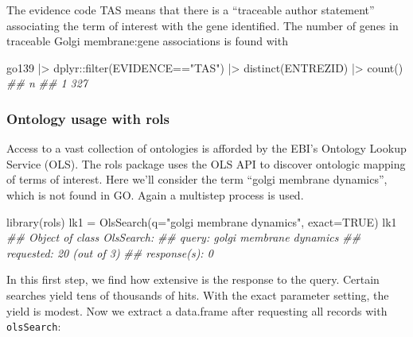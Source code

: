 \documentclass[]{article}
\newcommand{\hlstr}[1]{\textcolor[rgb]{0.251,0.627,0.251}{#1}}%
\newcommand{\hlcom}[1]{\textcolor[rgb]{0.502,0.502,0.502}{\textit{#1}}}%
\newcommand{\hlopt}[1]{\textcolor[rgb]{0,0,0}{#1}}%
\newcommand{\hlstd}[1]{\textcolor[rgb]{0.251,0.251,0.251}{#1}}%
\newcommand{\hlkwc}[1]{\textcolor[rgb]{0.251,0.251,0.251}{#1}}%
\newcommand{\hlkwd}[1]{\textcolor[rgb]{0.878,0.439,0.125}{#1}}%
\newenvironment{Shaded}{\begin{myshaded}}{\end{myshaded}}
\newcommand{\KeywordTok}[1]{\hlkwd{#1}}
\newcommand{\DataTypeTok}[1]{\hlkwc{#1}}
\newcommand{\StringTok}[1]{\hlstr{#1}}
\newcommand{\CommentTok}[1]{\hlcom{#1}}
\newcommand{\OtherTok}[1]{{#1}}
\newcommand{\OperatorTok}[1]{\hlopt{#1}}
\newcommand{\ErrorTok}[1]{\textcolor{errorcolor}{#1}}
\newcommand{\NormalTok}[1]{\hlstd{#1}}
\begin{document}
The evidence code TAS means that there is a ``traceable author statement''
associating the term of interest with the gene identified. The
number of genes in traceable Golgi membrane:gene associations
is found with

\begin{Shaded}
\begin{Highlighting}[]
\NormalTok{go139 }\OperatorTok{|}\ErrorTok{\textgreater{}}\StringTok{ }\NormalTok{dplyr}\OperatorTok{::}\KeywordTok{filter}\NormalTok{(EVIDENCE}\OperatorTok{==}\StringTok{"TAS"}\NormalTok{) }\OperatorTok{|}\ErrorTok{\textgreater{}}\StringTok{ }\KeywordTok{distinct}\NormalTok{(ENTREZID) }\OperatorTok{|}\ErrorTok{\textgreater{}}\StringTok{ }\KeywordTok{count}\NormalTok{()}
\CommentTok{\#\#     n}
\CommentTok{\#\# 1 327}
\end{Highlighting}
\end{Shaded}

\hypertarget{ontology-usage-with-rols}{%
\subsubsection{Ontology usage with rols}\label{ontology-usage-with-rols}}

Access to a vast collection of ontologies is afforded by the EBI's
Ontology Lookup Service (OLS). The rols package uses the OLS API
to discover ontologic mapping of terms of interest. Here we'll
consider the term ``golgi membrane dynamics'', which is not found in GO.
Again a multistep process is used.

\begin{Shaded}
\begin{Highlighting}[]
\KeywordTok{library}\NormalTok{(rols)}
\NormalTok{lk1 =}\StringTok{ }\KeywordTok{OlsSearch}\NormalTok{(}\DataTypeTok{q=}\StringTok{"golgi membrane dynamics"}\NormalTok{, }\DataTypeTok{exact=}\OtherTok{TRUE}\NormalTok{)}
\NormalTok{lk1}
\CommentTok{\#\# Object of class \textquotesingle{}OlsSearch\textquotesingle{}:}
\CommentTok{\#\#   query: golgi membrane dynamics }
\CommentTok{\#\#   requested: 20 (out of 3)}
\CommentTok{\#\#   response(s): 0}
\end{Highlighting}
\end{Shaded}

In this first step, we find how extensive is the response
to the query. Certain searches yield tens of thousands of hits.
With the exact parameter setting, the yield is modest.
Now we extract a data.frame after requesting all
records with \texttt{olsSearch}:
\end{document}
